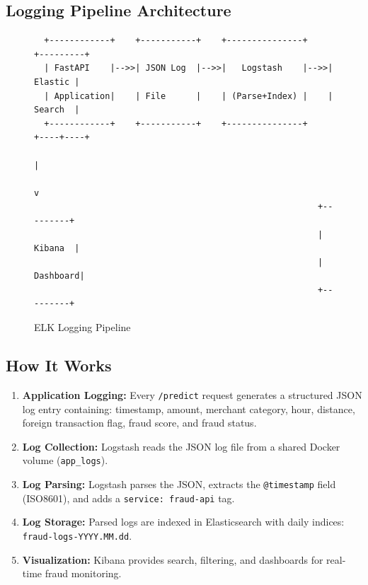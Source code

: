 \documentclass[12pt,a4paper]{article}
\begin{document}
\subsection{Logging Pipeline Architecture}

\begin{figure}[H]
\centering
\begin{verbatim}
  +------------+    +-----------+    +---------------+    +---------+
  | FastAPI    |-->>| JSON Log  |-->>|   Logstash    |-->>| Elastic |
  | Application|    | File      |    | (Parse+Index) |    | Search  |
  +------------+    +-----------+    +---------------+    +----+----+
                                                              |
                                                              v
                                                        +---------+
                                                        | Kibana  |
                                                        | Dashboard|
                                                        +---------+
\end{verbatim}
\caption{ELK Logging Pipeline}
\end{figure}

\subsection{How It Works}

\begin{enumerate}
    \item \textbf{Application Logging:} Every \texttt{/predict} request generates a structured JSON log entry containing: timestamp, amount, merchant category, hour, distance, foreign transaction flag, fraud score, and fraud status.

    \item \textbf{Log Collection:} Logstash reads the JSON log file from a shared Docker volume (\texttt{app\_logs}).

    \item \textbf{Log Parsing:} Logstash parses the JSON, extracts the \texttt{@timestamp} field (ISO8601), and adds a \texttt{service: fraud-api} tag.

    \item \textbf{Log Storage:} Parsed logs are indexed in Elasticsearch with daily indices: \texttt{fraud-logs-YYYY.MM.dd}.

    \item \textbf{Visualization:} Kibana provides search, filtering, and dashboards for real-time fraud monitoring.
\end{enumerate}
\end{document}
